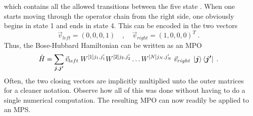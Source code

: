 which contains all the allowed transitions between the five state \cite{Schollwock}. When one starts moving through the operator chain from the right side, one obviously begins in state 1 and ends in state 4. This can be encoded in the two vectors
\begin{equation*}
 \vec{v}_{left} = (0 , 0 , 0  , 1) \quad , \quad \vec{v}_{right} = (1  , 0 ,0 , 0)^T \; .
\end{equation*}
Thus, the Bose-Hubbard Hamiltonian can be written as an MPO 
\begin{equation}
	\hat{H} = \sum_{\boldsymbol{j}, \boldsymbol{j'}} \vec{v}_{left} \; W^{[1] j_1 , j_1 '} W^{[2] j_2 , j_2 '} \ldots W^{[N] j_N , j_N '} \; \vec{v}_{right} \; \ket{\boldsymbol{j}} \bra{\boldsymbol{j'}} \; .
	\label{eq:MPOhamiltonian}
\end{equation}
Often, the two closing vectors are implicitly multiplied unto the outer matrices for a cleaner notation. Observe how all of this was done without having to do a single numerical computation. The resulting MPO can now readily be applied to an MPS.
